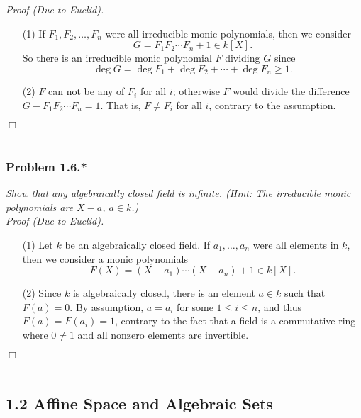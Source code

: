 \documentclass{article}
\begin{document}
\emph{Proof (Due to Euclid).}
\begin{enumerate}
\item[(1)]
  If
  $F_1, F_2, \ldots, F_n$ were all irreducible monic polynomials, then
  we consider
  \[
    G = F_1 F_2 \cdots F_n + 1 \in k[X].
  \]
  So there is an irreducible monic polynomial $F$ dividing $G$
  since
  \[
    \deg G = \deg F_1 + \deg F_2 + \cdots + \deg F_n \geq 1.
  \]

\item[(2)]
  $F$ can not be any of $F_i$ for all $i$;
  otherwise $F$ would divide the difference $G - F_1 F_2 \cdots F_n = 1$.
  That is, $F \neq F_i$ for all $i$, contrary to the assumption.
\end{enumerate}
$\Box$\\\\






\subsubsection*{Problem 1.6.*}
\emph{Show that any algebraically closed field is infinite.
(Hint: The irreducible monic polynomials are $X - a$, $a \in k$.)} \\

\emph{Proof (Due to Euclid).}
\begin{enumerate}
\item[(1)]
  Let $k$ be an algebraically closed field.
  If $a_1, \ldots, a_n$ were all elements in $k$, then
  we consider a monic polynomials
  \[
    F(X) = (X - a_1) \cdots (X - a_n) + 1 \in k[X].
  \]

\item[(2)]
  Since $k$ is algebraically closed,
  there is an element $a \in k$ such that $F(a) = 0$.
  By assumption, $a = a_i$ for some $1 \leq i \leq n$,
  and thus $F(a) = F(a_i) = 1$, contrary to the fact that
  a field is a commutative ring where $0 \neq 1$ and all nonzero elements are invertible.
\end{enumerate}
$\Box$\\\\






\subsection*{1.2 Affine Space and Algebraic Sets \\}
\end{document}
